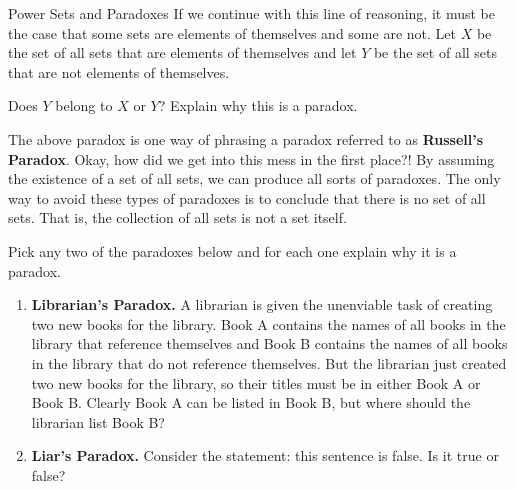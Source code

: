 \begin{section}{Power Sets and Paradoxes}
If we continue with this line of reasoning, it must be the case that some sets are elements of themselves and some are not.  Let $X$ be the set of all sets that are elements of themselves and let $Y$ be the set of all sets that are not elements of themselves.

\begin{problem}
Does $Y$ belong to $X$ or $Y$?  Explain why this is a paradox.
\end{problem}

The above paradox is one way of phrasing a paradox referred to as \textbf{Russell's Paradox}.  Okay, how did we get into this mess in the first place?!  By assuming the existence of a set of all sets, we can produce all sorts of paradoxes.  The only way to avoid these types of paradoxes is to conclude that there is no set of all sets.  That is, the collection of all sets is not a set itself.

%
%

\begin{problem}
Pick any two of the paradoxes below and for each one explain why it is a paradox.
\begin{enumerate}[label=\textrm{(\alph*)}]
\item \textbf{Librarian's Paradox.} A librarian is given the unenviable task of creating two new books for the library. Book A contains the names of all books in the library that reference themselves and Book B contains the names of all books in the library that do not reference themselves. But the librarian just created two new books for the library, so their titles must be in either Book A or Book B. Clearly Book A can be listed in Book B, but where should the librarian list Book B?

\item \textbf{Liar's Paradox.} Consider the statement: this sentence is false. Is it true or false?


\end{enumerate}
\end{problem}
\end{section}
